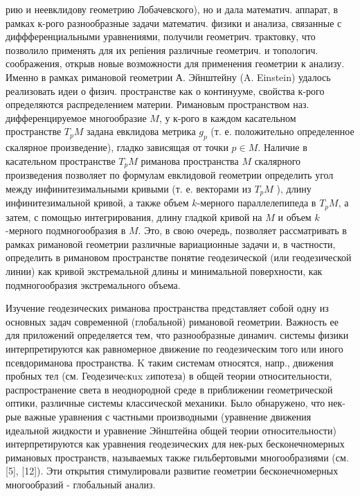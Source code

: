 \documentclass[10pt]{article}
\begin{document}
рию и неевклидову геометрию Лобачевского), но и дала математич. аппарат, в рамках к-рого разнообразные задачи математич. физики и анализа, связанные с диффференциальными уравнениями, получили геометрич. трактовку, что позволило применять для их репіения различные геометрич. и топологич. соображения, открыв новые возможности для применения геометрии к анализу. Именно в рамках римановой геометрии А. Эйнштейну (A. Einstein) удалось реализовать идеи о физич. пространстве как о континууме, свойства к-рого определяются распределением материи. Римановым пространством наз. дифференцируемое многообразие $M$, у к-рого в каждом касательном пространстве $T_{p} M$ задана евклидова метрика $g_{p}$ (т. е. положительно определенное скалярное произведение), гладко зависящая от точки $p \in M$. Наличие в касательном пространстве $T_{p} M$ риманова пространства $M$ скалярного произведения позволяет по формулам евклидовой геометрии определить угол между инфинитезимальными кривыми (т. е. векторами из $T_{p} M$ ), длину инфинитезимальной кривой, а также объем $k$-мерного параллелепипеда в $T_{p} M$, а затем, с помощью интегрирования, длину гладкой кривой на $M$ и объем $k$-мерного подмногообразия в $M$. Это, в свою очередь, позволяет рассматривать в рамках римановой геометрии различные вариационные задачи и, в частности, определить в римановом пространстве понятие геодезической (или геодезической линии) как кривой экстремальной длины и минимальной поверхности, как подмногообразия экстремального объема.



Изучение геодезических риманова пространства представляет собой одну из основных задач современной (глобальной) римановой геометрии. Важность ее для приложений определяется тем, что разнообразные динамич. системы физики интерпретируются как равномерное движение по геодезическим того или иного псевдориманова пространства. $\mathrm{K}$ таким системам относятся, напр., движения пробных тел (см. Геодезичеcкux zипотеза) в общей теории относительности, распространение света в неоднородной среде в приближении геометрической оптики, различные системы классической механики. Было обнаружено, что нек-рые важные уравнения с частными производными (уравнение движения идеальной жидкости и уравнение Эйнштейна общей теории относительности) интерпретируются как уравнения геодезических для нек-рых бесконечномерных римановых пространств, называемых также гильбертовыми многообразиями (см. [5], [12]). Эти открытия стимулировали развитие геометрии бесконечномерных многообразий - глобальный анализ.
\end{document}

